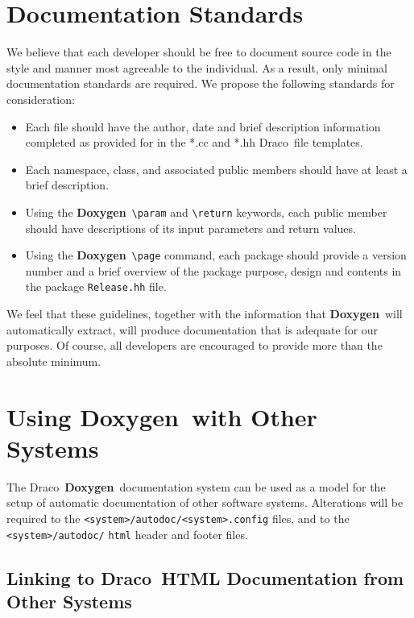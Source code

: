 \documentclass[11pt]{nmemo}
\newcommand{\draco}{{\normalfont\sffamily Draco}}
\newcommand{\doxy}{{\normalfont\bfseries Doxygen}}
\begin{document}

\section{Documentation Standards}
\label{sec:std}

We believe that each developer should be free to document source code
in the style and manner most agreeable to the individual. As a result,
only minimal documentation standards are required.  We propose the
following standards for consideration:

\begin{itemize}
\item Each file should have the author, date and brief description
  information completed as provided for in the *.cc and *.hh \draco\ 
  file templates.
\item Each namespace, class, and associated public members
  should have at least a brief description.
\item Using the \doxy\ \verb+\param+ and \verb+\return+ keywords,
  each public member should have descriptions of its input
  parameters and return values.
\item Using the \doxy\
 \verb+\page+ command, each package should provide a version number and
 a brief overview of the package purpose, design and contents in the package
 \texttt{Release.hh} file.
\end{itemize}

We feel that these guidelines, together with the information that
\doxy\ will automatically extract, will produce documentation that is
adequate for our purposes. Of course, all developers are 
encouraged to provide more than the absolute minimum.


\section{Using \doxy\ with Other Systems}

The \draco\ \doxy\ documentation system can be used as a model for
the setup of automatic documentation of other software systems. 
Alterations will be 
required to the \texttt{<system>/autodoc/<system>.config} files, and
to the \texttt{<system>/autodoc/} \texttt{html} header and footer files. 


\subsection{Linking to \draco\ HTML Documentation from Other Systems}
\end{document}
